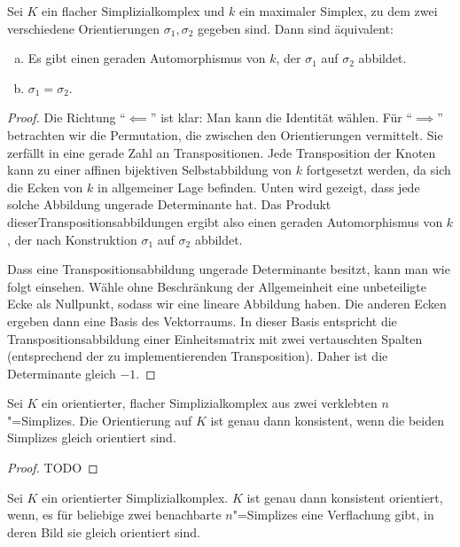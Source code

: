 \documentclass[ngerman, 11pt, a4paper, twoside, abstracton]{scrartcl}
\begin{document}
\begin{lemma}
  Sei $K$ ein flacher Simplizialkomplex und $k$ ein maximaler Simplex, zu dem zwei verschiedene Orientierungen $\sigma_1, \sigma_2$ gegeben sind. Dann sind äquivalent:
  \begin{enumerate}[(a)]
    \item Es gibt einen geraden Automorphismus von $k$, der $\sigma_1$ auf $\sigma_2$ abbildet.
    \item $\sigma_1 = \sigma_2$.
  \end{enumerate}
\end{lemma}
\begin{proof}
  Die Richtung \enquote{$\impliedby$} ist klar: Man kann die Identität wählen. Für \enquote{$\implies$} betrachten wir die Permutation, die zwischen den Orientierungen vermittelt. Sie zerfällt in eine gerade Zahl an Transpositionen. Jede Transposition der Knoten kann zu einer affinen bijektiven Selbstabbildung von $k$ fortgesetzt werden, da sich die Ecken von $k$ in allgemeiner Lage befinden. Unten wird gezeigt, dass jede solche Abbildung ungerade Determinante hat. Das Produkt dieserTranspositionsabbildungen ergibt also einen geraden Automorphismus von $k$, der nach Konstruktion $\sigma_1$ auf $\sigma_2$ abbildet.

  Dass eine Transpositionsabbildung ungerade Determinante besitzt, kann man wie folgt einsehen. Wähle ohne Beschränkung der Allgemeinheit eine unbeteiligte Ecke als Nullpunkt, sodass wir eine lineare Abbildung haben. Die anderen Ecken ergeben dann eine Basis des Vektorraums. In dieser Basis entspricht die Transpositionsabbildung einer Einheitsmatrix mit zwei vertauschten Spalten (entsprechend der zu implementierenden Transposition). Daher ist die Determinante gleich $-1$.
\end{proof}

\begin{lemma}
  Sei $K$ ein orientierter, flacher Simplizialkomplex aus zwei verklebten $n$"=Simplizes. Die Orientierung auf $K$ ist genau dann konsistent, wenn die beiden Simplizes gleich orientiert sind.
\end{lemma}
\begin{proof}
  TODO
\end{proof}

\begin{corollary}
  Sei $K$ ein orientierter Simplizialkomplex. $K$ ist genau dann konsistent orientiert, wenn, es für beliebige zwei benachbarte $n$"=Simplizes eine Verflachung gibt, in deren Bild sie gleich orientiert sind.
\end{corollary}
\end{document}
